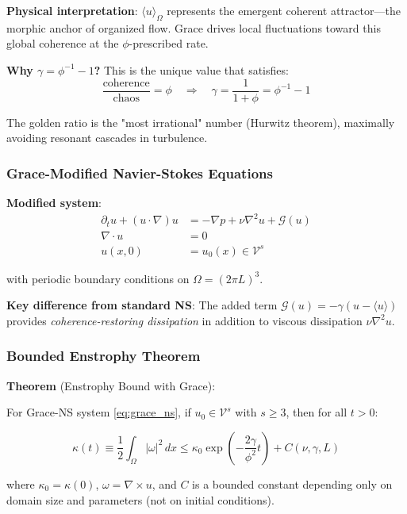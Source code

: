 \documentclass[12pt,a4paper]{article}
\begin{document}
\textbf{Physical interpretation}: $\langle u \rangle_\Omega$ represents the emergent coherent attractor—the morphic anchor of organized flow. Grace drives local fluctuations toward this global coherence at the $\phi$-prescribed rate.

\textbf{Why $\gamma = \phi^{-1} - 1$?} This is the unique value that satisfies:
\begin{equation}
\frac{\text{coherence}}{\text{chaos}} = \phi \quad \Rightarrow \quad \gamma = \frac{1}{1 + \phi} = \phi^{-1} - 1
\end{equation}

The golden ratio is the "most irrational" number (Hurwitz theorem), maximally avoiding resonant cascades in turbulence.

\subsubsection{Grace-Modified Navier-Stokes Equations}

\textbf{Modified system}:
\begin{align}
\partial_t u + (u \cdot \nabla) u &= -\nabla p + \nu \nabla^2 u + \mathcal{G}(u) \label{eq:grace_ns} \\
\nabla \cdot u &= 0 \\
u(x, 0) &= u_0(x) \in \mathcal{V}^s
\end{align}

with periodic boundary conditions on $\Omega = (2\pi L)^3$.

\textbf{Key difference from standard NS}: The added term $\mathcal{G}(u) = -\gamma (u - \langle u \rangle)$ provides \emph{coherence-restoring dissipation} in addition to viscous dissipation $\nu \nabla^2 u$.

\subsubsection{Bounded Enstrophy Theorem}

\textbf{Theorem} (Enstrophy Bound with Grace):

For Grace-NS system \eqref{eq:grace_ns}, if $u_0 \in \mathcal{V}^s$ with $s \geq 3$, then for all $t > 0$:

\begin{equation}
\kappa(t) \equiv \frac{1}{2} \int_\Omega |\omega|^2 \, dx \leq \kappa_0 \exp\left(-\frac{2\gamma}{\phi^2} t\right) + C(\nu, \gamma, L)
\end{equation}

where $\kappa_0 = \kappa(0)$, $\omega = \nabla \times u$, and $C$ is a bounded constant depending only on domain size and parameters (not on initial conditions).
\end{document}
